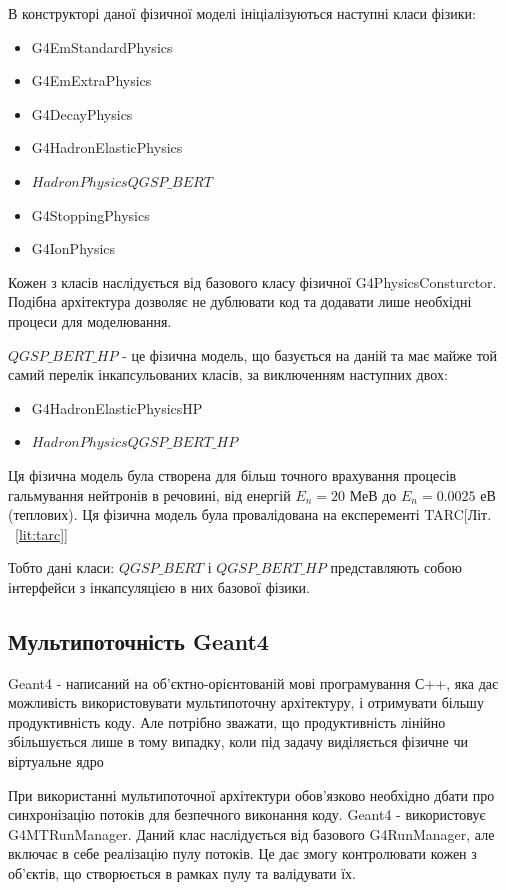 \documentclass[a4paper, 14pt]{article}
\numberwithin{equation}{section}
\numberwithin{table}{section}
\begin{document}
В конструкторі даної фізичної моделі ініціалізуються наступні класи фізики: 
\begin{itemize}
	\item G4EmStandardPhysics
	\item G4EmExtraPhysics
	\item G4DecayPhysics
	\item G4HadronElasticPhysics
	\item $HadronPhysicsQGSP\_BERT$
	\item G4StoppingPhysics
	\item G4IonPhysics
\end{itemize}
Кожен з класів наслідується від базового класу фізичної G4PhysicsConsturctor. Подібна архітектура дозволяє не дублювати код та додавати лише необхідні процеси для моделювання.

$QGSP\_BERT\_HP$ - це фізична модель, що базується на даній та має майже той самий перелік інкапсульованих класів, за виключенням наступних двох:
\begin{itemize}
	\item G4HadronElasticPhysicsHP
	\item $HadronPhysicsQGSP\_BERT\_HP$
\end{itemize}
Ця фізична модель була створена для більш точного врахування процесів гальмування нейтронів в речовині, від енергій $E_n = 20$ МеВ до $E_n = 0.0025$ еВ (теплових). Ця фізична модель була провалідована на експеременті TARC[Літ. ~\ref{lit:tarc}]

Тобто дані класи: $QGSP\_BERT$ і $QGSP\_BERT\_HP$ представляють собою інтерфейси з інкапсуляцією в них базової фізики.
	
\subsection{Мультипоточність Geant4}
Geant4 - написаний на об'єктно-орієнтованій мові програмування С++, яка дає можливість використовувати мультипоточну архітектуру, і отримувати більшу продуктивність коду. Але потрібно зважати, що продуктивність лінійно збільшується лише в тому випадку, коли під задачу виділяється фізичне чи віртуальне ядро 
	
При використанні мультипоточної архітектури обов'язково необхідно дбати про синхронізацію потоків для безпечного виконання коду. Geant4 - використовує G4MTRunManager. Даний клас наслідується від базового G4RunManager, але включає в себе реалізацію пулу потоків. Це дає змогу контролювати кожен з об'єктів, що створюється в рамках пулу та валідувати їх. 
\end{document}
